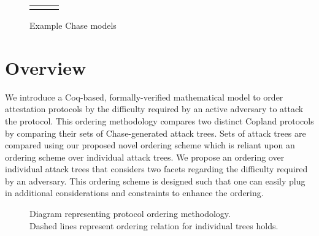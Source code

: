 \documentclass[runningheads]{llncs}
\theoremstyle{definition}
\begin{document}
\begin{figure}[hbtp]
    \centering 
    \begin{tabular}{c c c}
         &  &  
    \end{tabular}
    \caption[Example Chase Models]{Example Chase models}
    \label{fig:chase-ex}
\end{figure}




\section{Overview}
We introduce a Coq-based, formally-verified mathematical model to order attestation protocols by the difficulty required by an active adversary to attack the protocol. This ordering methodology compares two distinct Copland protocols by comparing their sets of Chase-generated attack trees. Sets of attack trees are compared using our proposed novel ordering scheme which is reliant upon an ordering scheme over individual attack trees. We propose an ordering over individual attack trees that considers two facets regarding the difficulty required by an adversary. This ordering scheme is designed such that one can easily plug in additional considerations and constraints to enhance the ordering.

\begin{figure}[hbtp]
    \centering
    \captionsetup{justification=centering,margin=1cm}
    
    \caption[Protocol ordering abstraction]{Diagram representing protocol ordering methodology. \\ Dashed lines represent ordering relation for individual trees holds. }
    \label{fig:protocol-org-fig}
\end{figure}
\end{document}
